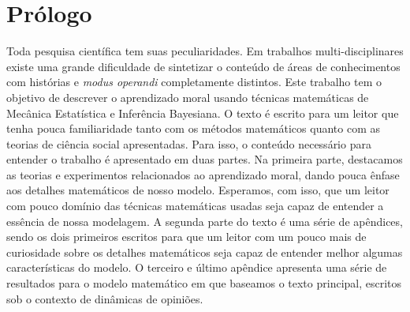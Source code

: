 
\chapter*{Prólogo}

Toda pesquisa científica tem suas peculiaridades. Em trabalhos
multi-disciplinares existe uma grande dificuldade de sintetizar o conteúdo de
áreas de conhecimentos com histórias e \textit{modus operandi} completamente
distintos. Este trabalho tem o objetivo de descrever o aprendizado moral
usando técnicas matemáticas de Mecânica Estatística e Inferência
Bayesiana. O texto é escrito para um leitor que tenha pouca familiaridade
tanto com os métodos matemáticos quanto com as teorias de ciência social
apresentadas. Para isso, o conteúdo necessário para entender o trabalho
é apresentado em duas partes. Na primeira parte, destacamos as teorias e
experimentos relacionados ao aprendizado moral, dando pouca ênfase
aos detalhes matemáticos de nosso modelo. Esperamos, com isso, que um leitor
com pouco domínio das técnicas matemáticas usadas seja capaz de entender
a essência de nossa modelagem. A segunda parte do texto é uma série de
apêndices, sendo os dois primeiros escritos para que um leitor com um pouco
mais de curiosidade sobre os detalhes matemáticos seja capaz de entender
melhor algumas características do modelo. O terceiro e último apêndice
apresenta uma série de resultados para o modelo matemático em que baseamos
o texto principal, escritos sob o contexto de dinâmicas de opiniões.
